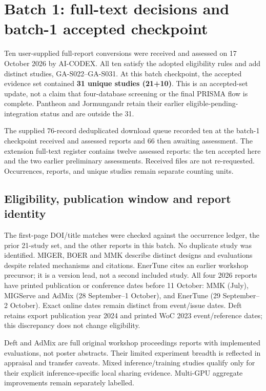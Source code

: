 \section{Batch 1: full-text decisions and batch-1 accepted checkpoint}\label{sec:batch1}

Ten user-supplied full-report conversions were received and assessed on 17 October 2026 by AI-CODEX. All ten satisfy the adopted eligibility rules and add distinct studies, GA-S022--GA-S031. At this batch checkpoint, the accepted evidence set contained \textbf{31 unique studies (21+10)}. This is an accepted-set update, not a claim that four-database screening or the final PRISMA flow is complete. Pantheon and Jormungandr retain their earlier eligible-pending-integration status and are outside the 31.

The supplied 76-record deduplicated download queue recorded ten at the batch-1 checkpoint received and assessed reports and 66 then awaiting assessment. The extension full-text register contains twelve assessed reports: the ten accepted here and the two earlier preliminary assessments. Received files are not re-requested. Occurrences, reports, and unique studies remain separate counting units.

\subsection{Eligibility, publication window and report identity}

The first-page DOI/title matches were checked against the occurrence ledger, the prior 21-study set, and the other reports in this batch. No duplicate study was identified. MIGER, BOER and MMK describe distinct designs and evaluations despite related mechanisms and citations. EnerTune cites an earlier workshop precursor; it is a version lead, not a second included study. All four 2026 reports have printed publication or conference dates before 11 October: MMK (July), MIGServe and AdMix (28 September--1 October), and EnerTune (29 September--2 October). Exact online dates remain distinct from event/issue dates. Deft retains export publication year 2024 and printed WoC 2023 event/reference dates; this discrepancy does not change eligibility.

Deft and AdMix are full original workshop proceedings reports with implemented evaluations, not poster abstracts. Their limited experiment breadth is reflected in appraisal and transfer caveats. Mixed inference/training studies qualify only for their explicit inference-specific local sharing evidence. Multi-GPU aggregate improvements remain separately labelled.

